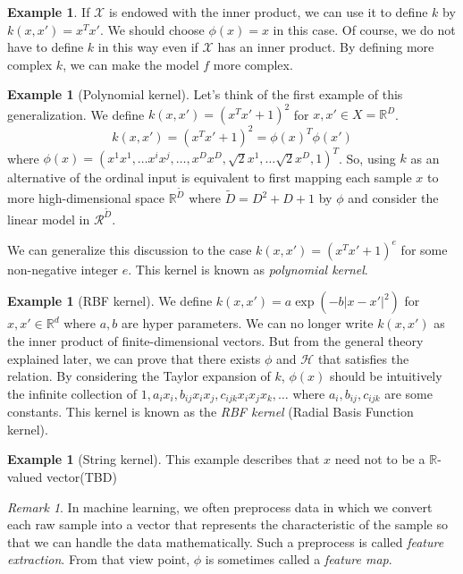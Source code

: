 \documentclass{amsart}
\theoremstyle{definition}
\newtheorem{example}[theorem]{Example}
\theoremstyle{remark}
\newtheorem{remark}[theorem]{Remark}
\numberwithin{equation}{section}
\begin{document}
\begin{example}
If $\mathcal{X}$ is endowed with the inner product, we can use it to define $k$ by $k(x, x') = x^Tx'$.
We should choose $\phi(x) = x$ in this case.
Of course, we do not have to define $k$ in this way even if $\mathcal{X}$ has an inner product.
By defining more complex $k$, we can make the model $f$ more complex.
\end{example}

\begin{example}[Polynomial kernel]
Let's think of the first example of this generalization.
We define $k(x, x') = (x^Tx' + 1)^2$ for $x, x'\in X = \mathbb{R}^D$.
\begin{equation}
k(x, x') = (x^Tx' + 1)^2 = \phi(x)^T\phi(x')
\end{equation}
where $\phi(x) = (x^1x^1, \ldots x^i x^j, \ldots, x^Dx^D, \sqrt{2}x^1, \ldots \sqrt{2}x^D, 1)^T$.
So, using $k$ as an alternative of the ordinal input is equivalent to first mapping each sample $x$ to
more high-dimensional space $\mathbb{R}^{\tilde{D}}$ where $\tilde{D} = D^2 + D + 1$ by $\phi$ and consider the linear model
in $\mathcal{R}^{\tilde{D}}$.

We can generalize this discussion to the case $k(x, x') = (x^Tx' + 1)^e$ for some non-negative integer $e$.
This kernel is known as \textit{polynomial kernel}.
\end{example}

\begin{example}[RBF kernel]
We define $k(x, x') = a\exp(-b |x-x'|^2)$ for $x, x'\in \mathbb{R}^d$ where $a, b$ are hyper parameters.
We can no longer write $k(x, x')$ as the inner product of finite-dimensional vectors.
But from the general theory explained later, we can prove that there exists $\phi$ and $\mathcal{H}$ that satisfies the relation.
By considering the Taylor expansion of $k$, $\phi(x)$ should be intuitively the infinite
collection of $1, a_ix_i, b_{ij}x_ix_j, c_{ijk}x_ix_jx_k, \ldots$ where $a_i, b_{ij}, c_{ijk}$ are some constants.
This kernel is known as the \textit{RBF kernel} (Radial Basis Function kernel).
\end{example}

\begin{example}[String kernel]
This example describes that $x$ need not to be a $\mathbb{R}$-valued vector(TBD)
\end{example}

\begin{remark}
In machine learning, we often preprocess data in which we convert each raw sample into a vector that
represents the characteristic of the sample so that we can handle the data mathematically.
Such a preprocess is called \textit{feature extraction}.
From that view point, $\phi$ is sometimes called a \textit{feature map}.
\end{remark}
\end{document}
